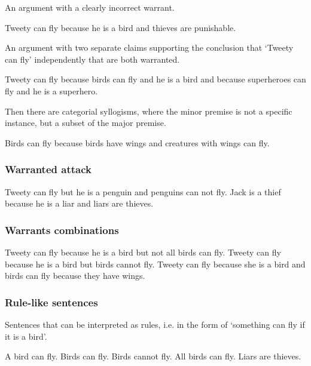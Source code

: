 \noindent An argument with a clearly incorrect warrant.
\begin{exe}
\ex\label{e44} Tweety can fly because he is a bird and thieves are punishable.
\end{exe}

\noindent An argument with two separate claims supporting the conclusion that `Tweety can fly' independently that are both warranted.
\begin{exe}
\ex\label{e45} Tweety can fly because birds can fly and he is a bird and because superheroes can fly and he is a superhero.
\end{exe}

\noindent Then there are categorial syllogisms, where the minor premise is not a specific instance, but a subset of the major premise.
\begin{exe}
\ex\label{e140} Birds can fly because birds have wings and creatures with wings can fly.
\end{exe}

\subsubsection{Warranted attack}
\begin{exe}
\ex\label{e46} Tweety can fly but he is a penguin and penguins can not fly.
\ex\label{e47} Jack is a thief because he is a liar and liars are thieves.
\end{exe}

\subsubsection{Warrants combinations}
\begin{exe}
\ex\label{e48} Tweety can fly because he is a bird but not all birds can fly.
\ex\label{e49} Tweety can fly because he is a bird but birds cannot fly.
\ex\label{e50} Tweety can fly because she is a bird and birds can fly because they have wings.
\end{exe}

\subsubsection{Rule-like sentences}
Sentences that can be interpreted as rules, i.e. in the form of `something can fly if it is a bird'.
\begin{exe}
\ex\label{e51} A bird can fly.
\ex\label{e52} Birds can fly.
\ex\label{e53} Birds cannot fly.
\ex\label{e54} All birds can fly.
\ex\label{e55} Liars are thieves.
\end{exe}

